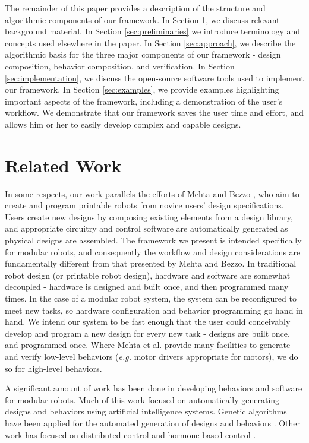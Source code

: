 \documentclass[graybox]{svmult}
\begin{document}
The remainder of this paper provides a  description of the
structure and algorithmic components of our framework.  In Section \ref{sec:related-work},
we discuss relevant background material.
In Section \ref{sec:preliminaries} we introduce terminology and  concepts used elsewhere in the
paper. 
In Section \ref{sec:approach}, we describe the algorithmic basis
for the three major components of our framework - design composition, behavior
composition, and verification.  In Section
\ref{sec:implementation}, we discuss the open-source software
tools used to implement our framework. In Section \ref{sec:examples}, we provide examples highlighting
important aspects of the framework, including a demonstration of the user's
workflow.  We demonstrate that our framework saves the
user time and effort, and allows him or her to easily develop complex and
capable designs.

\section{Related Work} \label{sec:related-work} 
In some respects, our work parallels the efforts of Mehta \cite{mehta2014design}
and Bezzo \cite{bezzo2014demo}, who aim to create and program printable robots
from novice users' design specifications.  Users create new designs by composing
existing elements from a design library, and appropriate circuitry and control
software are automatically generated as physical designs are assembled. The
framework we present is intended specifically for modular robots, and
consequently the workflow and design considerations are fundamentally different
from that presented by Mehta and Bezzo.  In traditional robot design (or
printable robot design), hardware and software are somewhat decoupled - hardware
is designed and built once, and then programmed many times.  In the case of a
modular robot system, the system can be reconfigured to meet new tasks, so
hardware configuration and behavior programming go hand in hand.  We intend our
system to be fast enough that the user could conceivably develop and program a
new design for every new task - designs are built once, and programmed once.
Where Mehta et al. provide many facilities to generate and verify low-level
behaviors (\textit{e.g.} motor drivers appropriate for motors), we do so for
high-level behaviors.

A significant amount of work has been done in developing behaviors and software
for modular robots. Much of this work focused on automatically generating
designs and behaviors using artificial intelligence systems. Genetic algorithms
have been applied for the automated generation of designs and behaviors
\cite{hornby2003generative}. Other work has focused on distributed control
\cite{walter2002choosing} and hormone-based control \cite{salemi2001hormone}.
\end{document}
